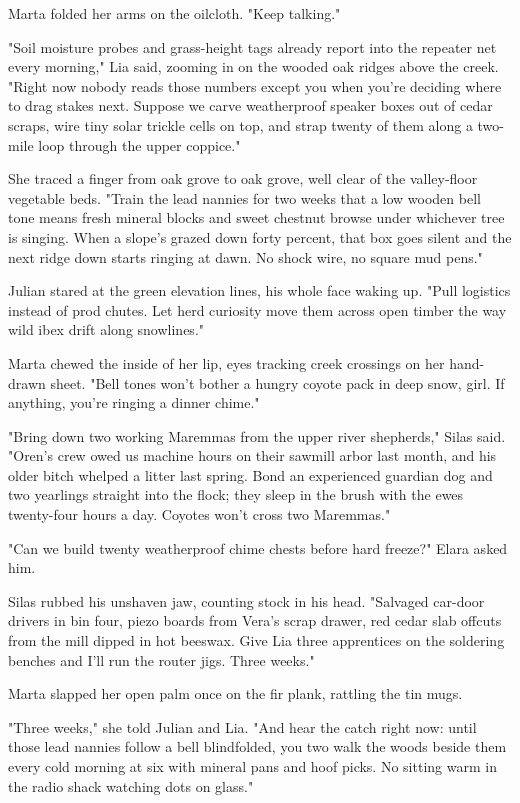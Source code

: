 Marta folded her arms on the oilcloth. "Keep talking."

"Soil moisture probes and grass-height tags already report into the repeater net every morning," Lia said, zooming in on the wooded oak ridges above the creek. "Right now nobody reads those numbers except you when you're deciding where to drag stakes next. Suppose we carve weatherproof speaker boxes out of cedar scraps, wire tiny solar trickle cells on top, and strap twenty of them along a two-mile loop through the upper coppice."

She traced a finger from oak grove to oak grove, well clear of the valley-floor vegetable beds. "Train the lead nannies for two weeks that a low wooden bell tone means fresh mineral blocks and sweet chestnut browse under whichever tree is singing. When a slope's grazed down forty percent, that box goes silent and the next ridge down starts ringing at dawn. No shock wire, no square mud pens."

Julian stared at the green elevation lines, his whole face waking up. "Pull logistics instead of prod chutes. Let herd curiosity move them across open timber the way wild ibex drift along snowlines."

Marta chewed the inside of her lip, eyes tracking creek crossings on her hand-drawn sheet. "Bell tones won't bother a hungry coyote pack in deep snow, girl. If anything, you're ringing a dinner chime."

"Bring down two working Maremmas from the upper river shepherds," Silas said. "Oren's crew owed us machine hours on their sawmill arbor last month, and his older bitch whelped a litter last spring. Bond an experienced guardian dog and two yearlings straight into the flock; they sleep in the brush with the ewes twenty-four hours a day. Coyotes won't cross two Maremmas."

"Can we build twenty weatherproof chime chests before hard freeze?" Elara asked him.

Silas rubbed his unshaven jaw, counting stock in his head. "Salvaged car-door drivers in bin four, piezo boards from Vera's scrap drawer, red cedar slab offcuts from the mill dipped in hot beeswax. Give Lia three apprentices on the soldering benches and I'll run the router jigs. Three weeks."

Marta slapped her open palm once on the fir plank, rattling the tin mugs.

"Three weeks," she told Julian and Lia. "And hear the catch right now: until those lead nannies follow a bell blindfolded, you two walk the woods beside them every cold morning at six with mineral pans and hoof picks. No sitting warm in the radio shack watching dots on glass."

